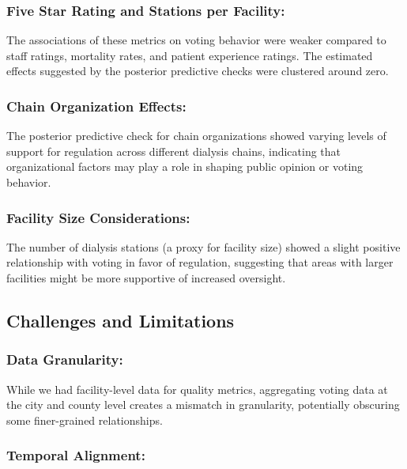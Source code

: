 \documentclass[
  11pt,
  letterpaper,
  DIV=11,
  numbers=noendperiod]{scrartcl}
\begin{document}
\subsubsection{Five Star Rating and Stations per
Facility:}\label{five-star-rating-and-stations-per-facility}

The associations of these metrics on voting behavior were weaker
compared to staff ratings, mortality rates, and patient experience
ratings. The estimated effects suggested by the posterior predictive
checks were clustered around zero.

\subsubsection{Chain Organization
Effects:}\label{chain-organization-effects}

The posterior predictive check for chain organizations showed varying
levels of support for regulation across different dialysis chains,
indicating that organizational factors may play a role in shaping public
opinion or voting behavior.

\subsubsection{Facility Size
Considerations:}\label{facility-size-considerations}

The number of dialysis stations (a proxy for facility size) showed a
slight positive relationship with voting in favor of regulation,
suggesting that areas with larger facilities might be more supportive of
increased oversight.

\subsection{Challenges and
Limitations}\label{challenges-and-limitations}

\subsubsection{Data Granularity:}\label{data-granularity}

While we had facility-level data for quality metrics, aggregating voting
data at the city and county level creates a mismatch in granularity,
potentially obscuring some finer-grained relationships.

\subsubsection{Temporal Alignment:}\label{temporal-alignment}
\end{document}
